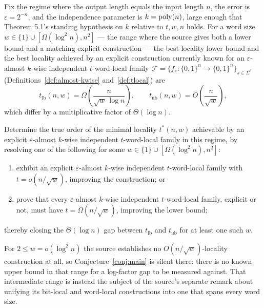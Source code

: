 \documentclass{aicr-conjecture}
\newcommand{\Om}{\Omega}
\newcommand{\eps}{\varepsilon}
\begin{document}
\begin{conjecture}\label{conj:main}
Fix the regime where the output length equals the input length $n$,
the error is $\eps = 2^{-n}$, and the independence parameter is $k =
\mathrm{poly}(n)$, large enough that Theorem 5.1's standing hypothesis on $k$
relative to $t, w, n$ holds. For a word size $w \in \{1\} \cup
[\Om(\log^{2}n), n^{2}]$ --- the range where the source gives both a
lower bound and a matching explicit construction --- the best locality
lower bound and the best locality achieved by an explicit construction
currently known for an $\eps$-almost $k$-wise independent $t$-word-local
family $\mathcal{F} = \{f_{s} : \{0,1\}^{n} \to \{0,1\}^{n}\}_{s \in
\Sigma^{\ell}}$ (Definitions~\ref{def:almost-kwise}
and~\ref{def:tlocal}) are
\[
  t_{\mathrm{lb}}(n,w) = \Om\!\left(\frac{n}{\sqrt{w}\,\log n}\right),
  \qquad
  t_{\mathrm{ub}}(n,w) = O\!\left(\frac{n}{\sqrt{w}}\right),
\]
which differ by a multiplicative factor of $\Theta(\log n)$.

Determine the true order of the minimal locality $t^{*}(n,w)$
achievable by an explicit $\eps$-almost $k$-wise independent
$t$-word-local family in this regime, by resolving one of the following
for some $w \in \{1\} \cup [\Om(\log^{2}n), n^{2}]$:
\begin{enumerate}[nosep,label=(\alph*)]
  \item exhibit an explicit $\eps$-almost $k$-wise independent
    $t$-word-local family with $t = o(n/\sqrt{w})$, improving the
    construction; or
  \item prove that every $\eps$-almost $k$-wise independent
    $t$-word-local family, explicit or not, must have $t =
    \Om(n/\sqrt{w})$, improving the lower bound;
\end{enumerate}
thereby closing the $\Theta(\log n)$ gap between $t_{\mathrm{lb}}$ and
$t_{\mathrm{ub}}$ for at least one such $w$.
\end{conjecture}

\begin{remark}
For $2 \le w = o(\log^{2}n)$ the source establishes no
$O(n/\sqrt{w})$-locality construction at all, so
Conjecture~\ref{conj:main} is silent there: there is no known upper
bound in that range for a log-factor gap to be measured against. That
intermediate range is instead the subject of the source's separate
remark about unifying its bit-local and word-local constructions into
one that spans every word size.
\end{remark}
\end{document}
